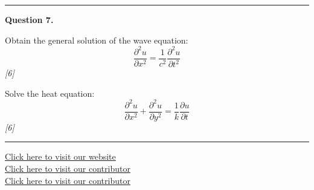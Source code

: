 \documentclass[11pt,a4paper]{article}
\newcommand{\pts}[1]{\hfill   \textit{[#1]}}
\begin{document}
\medskip\rule{\linewidth}{0.2pt}

\medskip


\noindent   \textbf{Question 7.}

\begin{parts}
  \item Obtain the general solution of the wave equation:
  \[
  \frac{\partial^2 u}{\partial x^2} = \frac{1}{c^2}\frac{\partial^2 u}{\partial t^2}
  \] \pts{6}
  \item Solve the heat equation:
  \[
  \frac{\partial^2 u}{\partial x^2} + \frac{\partial^2 u}{\partial y^2} = \frac{1}{k}\frac{\partial u}{\partial t}
  \] \pts{6}
\end{parts}

\vfill\rule{\linewidth}{0.4pt}

\begin{center}\small
  \href{https://bhu-exam.vercel.app/}{Click here to visit our website}\\[4pt]
  \href{https://me-aryan.vercel.app/}{Click here to visit our contributor}\\[4pt]
  \href{https://quashan-me.vercel.app/}{Click here to visit our contributor}
\end{center}
\end{document}
